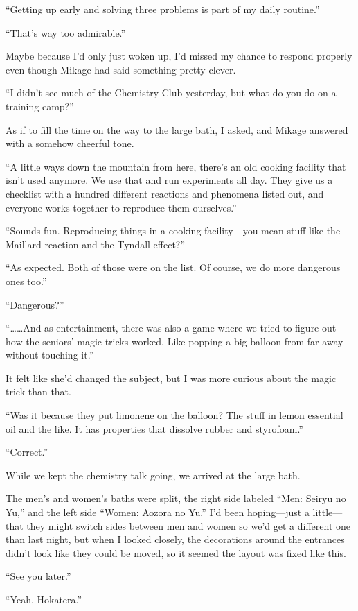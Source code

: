 \documentclass[
    a4paper,
    12pt,
    twoside,
    openany,
    UTF8,
    fontset=windows
]{ctexbook}
\begin{document}
``Getting up early and solving three problems is part of my daily routine.''

``That's way too admirable.''

Maybe because I'd only just woken up, I'd missed my chance to respond properly even though Mikage had said something pretty clever.

``I didn't see much of the Chemistry Club yesterday, but what do you do on a training camp?''

As if to fill the time on the way to the large bath, I asked, and Mikage answered with a somehow cheerful tone.

``A little ways down the mountain from here, there's an old cooking facility that isn't used anymore. We use that and run experiments all day. They give us a checklist with a hundred different reactions and phenomena listed out, and everyone works together to reproduce them ourselves.''

``Sounds fun. Reproducing things in a cooking facility---you mean stuff like the Maillard reaction and the Tyndall effect?''

``As expected. Both of those were on the list. Of course, we do more dangerous ones too.''

``Dangerous?''

``\dots\dots And as entertainment, there was also a game where we tried to figure out how the seniors' magic tricks worked. Like popping a big balloon from far away without touching it.''

It felt like she'd changed the subject, but I was more curious about the magic trick than that.

``Was it because they put limonene on the balloon? The stuff in lemon essential oil and the like. It has properties that dissolve rubber and styrofoam.''

``Correct.''

While we kept the chemistry talk going, we arrived at the large bath.

The men's and women's baths were split, the right side labeled ``Men: Seiryu no Yu,'' and the left side ``Women: Aozora no Yu.'' I'd been hoping---just a little---that they might switch sides between men and women so we'd get a different one than last night, but when I looked closely, the decorations around the entrances didn't look like they could be moved, so it seemed the layout was fixed like this.

``See you later.''

``Yeah, Hokatera.''
\end{document}
